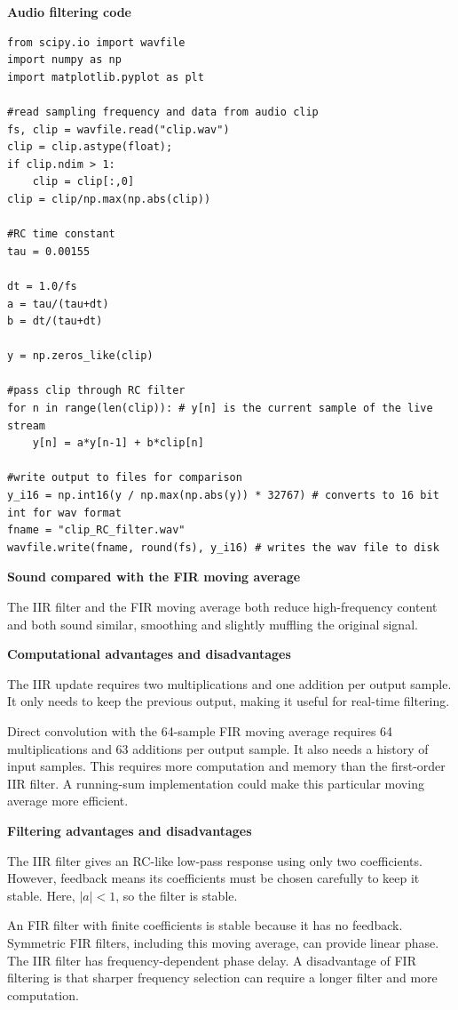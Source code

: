 \documentclass[11pt]{article}
\newcommand{\topic}[1]{\Needspace{4\baselineskip}\par\textbf{#1}\par\nopagebreak}
\begin{document}
\topic{Audio filtering code}

\begin{lstlisting}[style=python]
from scipy.io import wavfile
import numpy as np
import matplotlib.pyplot as plt

#read sampling frequency and data from audio clip
fs, clip = wavfile.read("clip.wav")
clip = clip.astype(float); 
if clip.ndim > 1: 
    clip = clip[:,0]
clip = clip/np.max(np.abs(clip))

#RC time constant
tau = 0.00155

dt = 1.0/fs
a = tau/(tau+dt)
b = dt/(tau+dt)

y = np.zeros_like(clip)

#pass clip through RC filter
for n in range(len(clip)): # y[n] is the current sample of the live stream
    y[n] = a*y[n-1] + b*clip[n]

#write output to files for comparison
y_i16 = np.int16(y / np.max(np.abs(y)) * 32767) # converts to 16 bit int for wav format
fname = "clip_RC_filter.wav"
wavfile.write(fname, round(fs), y_i16) # writes the wav file to disk
\end{lstlisting}

\topic{Sound compared with the FIR moving average}

The IIR filter and the FIR moving average both reduce high-frequency content and both sound similar, smoothing and slightly muffling the original signal.

\topic{Computational advantages and disadvantages}

The IIR update requires two multiplications and one addition per output sample. It only needs to keep the previous output, making it useful for real-time filtering.

Direct convolution with the 64-sample FIR moving average requires 64 multiplications and 63 additions per output sample. It also needs a history of input samples. This requires more computation and memory than the first-order IIR filter. A running-sum implementation could make this particular moving average more efficient.

\topic{Filtering advantages and disadvantages}

The IIR filter gives an RC-like low-pass response using only two coefficients. However, feedback means its coefficients must be chosen carefully to keep it stable. Here, $|a|<1$, so the filter is stable.

An FIR filter with finite coefficients is stable because it has no feedback. Symmetric FIR filters, including this moving average, can provide linear phase. The IIR filter has frequency-dependent phase delay. A disadvantage of FIR filtering is that sharper frequency selection can require a longer filter and more computation.
\end{document}
